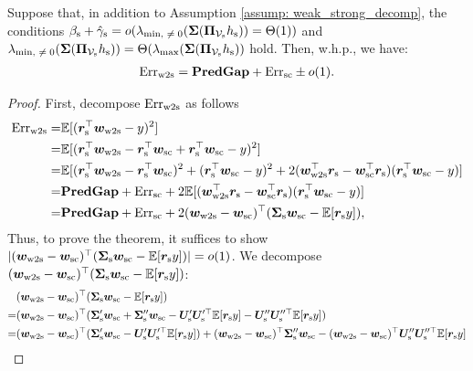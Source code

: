 \begin{theorem}\label{thm: ewtos=predgap+errsc}
Suppose that, in addition to Assumption \ref{assump: weak_strong_decomp}, the conditions 
$
\beta_{\text{s}} + \hat{\gamma}_{\text{s}} = o(\lambda_{\text{min, $\neq 0$}}({\bm{\Sigma}}({\bm{\Pi}}_{{\mathcal{V}}_{\text{s}}}h_{\text{s}}))=\Theta(1))
$ and $\lambda_{\text{min, $\neq 0$}}({\bm{\Sigma}}({\bm{\Pi}}_{{\mathcal{V}}_{\text{s}}}h_{\text{s}}))=\Theta(\lambda_{\max}({\bm{\Sigma}}({\bm{\Pi}}_{{\mathcal{V}}_{\text{s}}}h_{\text{s}}))$
hold. Then, w.h.p., we have:
\begin{align}
\nonumber
    \text{Err}_{\text{w2s}} = \textbf{PredGap} + \text{Err}_{\text{sc}} \pm o(1).
\end{align}
\end{theorem}
\begin{proof}
First, decompose $\text{Err}_{\text{w2s}}$ as follows
\begin{align}
    \nonumber
    \text{Err}_{\text{w2s}} = & \mathbb{E}[ ({\bm{r}}_{\text{s}}^\top{\bm{w}}_{\text{w2s}} - y)^2 ]\\
    \nonumber
    = & \mathbb{E}[ ({\bm{r}}_{\text{s}}^\top{\bm{w}}_{\text{w2s}} - {\bm{r}}_{\text{s}}^\top{\bm{w}}_{\text{sc}} + {\bm{r}}_{\text{s}}^\top{\bm{w}}_{\text{sc}}-  y)^2 ]\\
    \nonumber
    = & \mathbb{E}[ ({\bm{r}}_{\text{s}}^\top{\bm{w}}_{\text{w2s}} - {\bm{r}}_{\text{s}}^\top{\bm{w}}_{\text{sc}})^2 + ({\bm{r}}_{\text{s}}^\top{\bm{w}}_{\text{sc}}-  y)^2 + 2({\bm{w}}_{\text{w2s}}^\top{\bm{r}}_{\text{s}}- {\bm{w}}_{\text{sc}}^\top{\bm{r}}_{\text{s}})( {\bm{r}}_{\text{s}}^\top{\bm{w}}_{\text{sc}}-  y) ] \\
    \nonumber
    = & \textbf{PredGap}{} + \text{Err}_{\text{sc}} + 2\mathbb{E}[({\bm{w}}_{\text{w2s}}^\top{\bm{r}}_{\text{s}}- {\bm{w}}_{\text{sc}}^\top{\bm{r}}_{\text{s}})( {\bm{r}}_{\text{s}}^\top{\bm{w}}_{\text{sc}}-  y)]\\
    = & \textbf{PredGap}{} + \text{Err}_{\text{sc}} + 2({\bm{w}}_{\text{w2s}}- {\bm{w}}_{\text{sc}})^\top({\bm{\Sigma}}_{\text{s}} {\bm{w}}_{\text{sc}}- \mathbb{E} [{\bm{r}}_{\text{s}} y]),
\end{align}
Thus, to prove the theorem, it suffices to show $| ({\bm{w}}_{\text{w2s}}- {\bm{w}}_{\text{sc}})^\top({\bm{\Sigma}}_{\text{s}} {\bm{w}}_{\text{sc}}- \mathbb{E} [{\bm{r}}_{\text{s}} y]) |=o(1)$. We decompose $({\bm{w}}_{\text{w2s}}- {\bm{w}}_{\text{sc}})^\top({\bm{\Sigma}}_{\text{s}} {\bm{w}}_{\text{sc}}- \mathbb{E} [{\bm{r}}_{\text{s}} y])$:
\begin{align}
    \nonumber
    &(\vw_\wtos- \vw_\sceiling)^\top(\mSigma_\s \vw_\sceiling- \E [\vr_\s y]) \\
    \nonumber
    = & (\vw_\wtos- \vw_\sceiling)^\top(\mSigma_\s' \vw_\sceiling+\mSigma_\s'' \vw_\sceiling- \mU_\s'\mU_\s'^\top\E [\vr_\s y]-\mU_\s''\mU_\s''^\top\E [\vr_\s y])\\
    \label{eq: wwsigmawery_decomp}
    = & (\vw_\wtos- \vw_\sceiling)^\top(\mSigma_\s' \vw_\sceiling- \mU_\s'\mU_\s'^\top\E [\vr_\s y]) + (\vw_\wtos- \vw_\sceiling)^\top\mSigma_\s'' \vw_\sceiling- (\vw_\wtos- \vw_\sceiling)^\top\mU_\s''\mU_\s''^\top\E [\vr_\s y]

\end{align}
\end{proof}

